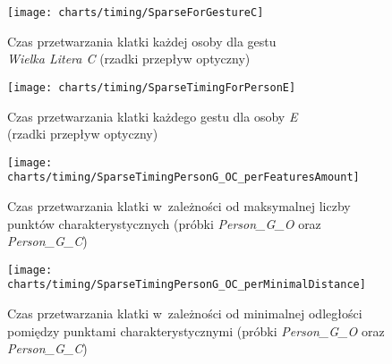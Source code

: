       \begin{figure}[!ht]
        \centering
        \texttt{[image: charts/timing/SparseForGestureC]}
        \caption[Czas przetwarzania klatki każdej osoby dla gestu C (rzadki przepływ optyczny)]
                {Czas przetwarzania klatki każdej osoby dla gestu\\\textit{Wielka Litera C} (rzadki przepływ optyczny)}
        \label{fig:SparseForGestureC}
      \end{figure}

      \begin{figure}[!ht]
        \centering
        \texttt{[image: charts/timing/SparseTimingForPersonE]}
        \caption[Czas przetwarzania klatki każdego gestu dla osoby E (rzadki przepływ optyczny)]
                {Czas przetwarzania klatki każdego gestu dla osoby \textit{E}\\(rzadki przepływ optyczny)}
        \label{fig:SparseTimingForPersonE}
      \end{figure}

    \newpage
      \begin{figure}[!ht]
        \centering
        \texttt{[image: charts/timing/SparseTimingPersonG\_OC\_perFeaturesAmount]}
        \caption[Czas przetwarzania klatki w~zależności od maksymalnej liczby punktów charakterystycznych]
                {Czas przetwarzania klatki w~zależności od maksymalnej liczby punktów charakterystycznych (próbki \textit{Person\_G\_O} oraz \textit{Person\_G\_C})}
        \label{fig:TimingPerFeaturesAmount}
      \end{figure}

      \begin{figure}[!ht]
        \centering
        \texttt{[image: charts/timing/SparseTimingPersonG\_OC\_perMinimalDistance]}
        \caption[Czas przetwarzania klatki w~zależności od minimalnej odległości pomiędzy punktami charakterystycznymi]
                {Czas przetwarzania klatki w~zależności od minimalnej odległości pomiędzy punktami charakterystycznymi (próbki \textit{Person\_G\_O} oraz \textit{Person\_G\_C})}
        \label{fig:TimingPerMinimalDistance}
      \end{figure}

